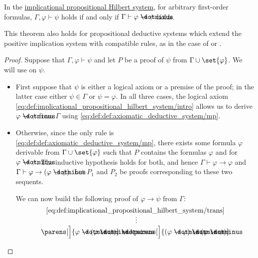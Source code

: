 \begin{theorem}\label{thm:syntactic_deduction_theorem}
  In the \hyperref[def:implicational_propositional_hilbert_system]{implicational propositional Hilbert system}, for arbitrary first-order formulas, \( \Gamma, \varphi \vdash \psi \) holds if and only if \( \Gamma \vdash \varphi \synimplies \psi \) holds.
\end{theorem}
\begin{comments}
  \item This theorem also holds for propositional deductive systems which extend the positive implication system with compatible rules, as in the case of  or .
\end{comments}
\begin{proof}
  \SufficiencySubProof Suppose that \( \Gamma, \varphi \vdash \psi \) and let \( P \) be a proof of \( \psi \) from \( \Gamma \cup \set{ \varphi } \). We will use  on \( \psi \).

  \begin{itemize}
    \item First suppose that \( \psi \) is either a logical axiom or a premise of the proof; in the latter case either \( \psi \in \Gamma \) or \( \psi = \varphi \). In all three cases, the logical axiom \eqref{eq:def:implicational_propositional_hilbert_system/intro} allows us to derive \( \varphi \synimplies \psi \) from \( \Gamma \) using \eqref{eq:def:def:axiomatic_deductive_system/mp}.

    \item Otherwise, since the only rule is \eqref{eq:def:def:axiomatic_deductive_system/mp}, there exists some formula \( \varphi \) derivable from \( \Gamma \cup \set{ \varphi } \) such that \( P \) contains the formulas \( \varphi \) and for \( \varphi \synimplies \psi \). The inductive hypothesis holds for both, and hence \( \Gamma \vdash \varphi \to \varphi \) and \( \Gamma \vdash \varphi \to (\varphi \synimplies \psi) \). Let \( P_1 \) and \( P_2 \) be proofs corresponding to these two sequents.

    We can now build the following proof of \( \varphi \to \psi \) from \( \Gamma \):
    \begin{equation*}
      \begin{prooftree}
        \hypo{ \eqref{eq:def:implicational_propositional_hilbert_system/trans} }
        \ellipsis
          {}
          {
            \parens[\Big]{ \varphi \synimplies (\varphi \synimplies \psi) } \synimplies \parens[\Big]{ (\varphi \synimplies \varphi) \synimplies (\varphi \synimplies \psi)}
          }


\end{prooftree}
\end{equation*}
\end{itemize}
\end{proof}
